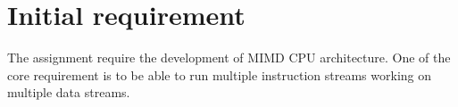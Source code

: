 \section {Initial requirement}
The assignment require the development of MIMD CPU architecture.
One of the core requirement is to be able to run multiple instruction streams working on multiple data streams.

